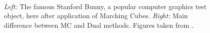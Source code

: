 \begin{figure}
\centering
   \\
   \caption{\textit{Left:} The famous Stanford Bunny, a popular computer graphics test object, here after application of Marching Cubes. \textit{Right:} Main difference between MC and Dual methods.  Figures taken from \cite{Hermite2002}. }
   \label{fig:bunny_MCDC}
\end{figure}







